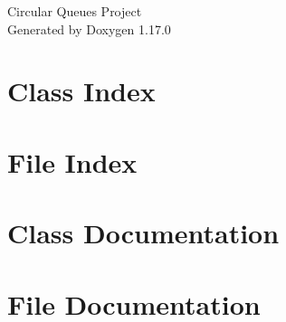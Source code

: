 \documentclass[twoside]{book}
\newcommand{\+}{\discretionary{\mbox{\scriptsize$\hookleftarrow$}}{}{}}
\newcommand{\clearemptydoublepage}{%
    \newpage{\pagestyle{empty}\cleardoublepage}%
  }
\begin{document}
  \raggedbottom
    \hypersetup{pageanchor=false,
                bookmarksnumbered=true,
                pdfencoding=unicode
               }
  \begin{titlepage}
  \vspace*{7cm}
  \begin{center}%
  {\Large Circular Queues Project}\\
  \vspace*{1cm}
  {\large Generated by Doxygen 1.17.0}\\
  \end{center}
  \end{titlepage}
  \clearemptydoublepage
  \tableofcontents
  \clearemptydoublepage
  \hypersetup{pageanchor=true}

\chapter{Class Index}

\chapter{File Index}

\chapter{Class Documentation}

\chapter{File Documentation}

  \backmatter
  \newpage
  \clearemptydoublepage
  \printindex
\end{document}
